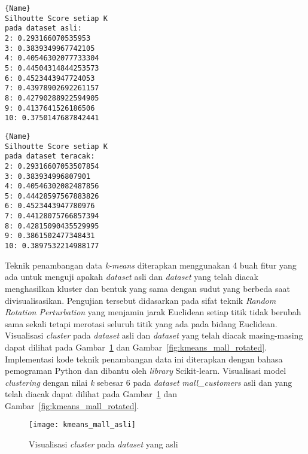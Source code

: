 \noindent\begin{minipage}{.48\textwidth}
\begin{lstlisting}[caption=\textit{Dataset mall\_customers} Asli,frame=tlrb, label=mall_customers_siluet_asli]{Name}
Silhoutte Score setiap K
pada dataset asli: 
2: 0.293166070535953
3: 0.3839349967742105
4: 0.40546302077733304
5: 0.44504314844253573
6: 0.4523443947724053
7: 0.43978902692261157
8: 0.42790288922594905
9: 0.4137641526186506
10: 0.3750147687842441
\end{lstlisting}
\end{minipage}\hfill
\begin{minipage}{.48\textwidth}
\begin{lstlisting}[caption=\textit{Dataset mall\_customers} Teracak,frame=tlrb, label=mall_customers_siluet_randomisasi]{Name}
Silhoutte Score setiap K
pada dataset teracak: 
2: 0.29316607053507854
3: 0.383934996807901
4: 0.40546302082487856
5: 0.44428597567883826
6: 0.4523443947780976
7: 0.44128075766857394
8: 0.42815090435529995
9: 0.3861502477348431
10: 0.3897532214988177
\end{lstlisting}
\end{minipage}

Teknik penambangan data \textit{k-means} diterapkan menggunakan 4 buah fitur yang ada untuk menguji apakah \textit{dataset} asli dan \textit{dataset} yang telah diacak menghasilkan kluster dan bentuk yang sama dengan sudut yang berbeda saat divisualisasikan. Pengujian tersebut didasarkan pada sifat teknik \textit{Random Rotation Perturbation} yang menjamin jarak Euclidean setiap titik tidak berubah sama sekali tetapi merotasi seluruh titik yang ada pada bidang Euclidean. Visualisasi \textit{cluster} pada \textit{dataset} asli dan \textit{dataset} yang telah diacak masing-masing dapat dilihat pada Gambar~\ref{fig:kmeans_mall_asli} dan Gambar~\ref{fig:kmeans_mall_rotated}. Implementasi kode teknik penambangan data ini diterapkan dengan bahasa pemograman Python dan dibantu oleh \textit{library} Scikit-learn. Visualisasi model \textit{clustering} dengan nilai \textit{k} sebesar 6 pada \textit{dataset} \textit{mall\_customers} asli dan yang telah diacak dapat dilihat pada Gambar~\ref{fig:kmeans_mall_asli} dan Gambar~\ref{fig:kmeans_mall_rotated}. 

\begin{figure}
	\centering
	\texttt{[image: kmeans\_mall\_asli]}
	\caption{Visualisasi \textit{cluster} pada \textit{dataset} yang asli}
	\label{fig:kmeans_mall_asli}
\end{figure}


